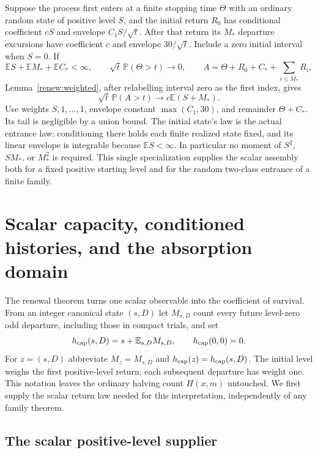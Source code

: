 \documentclass[11pt]{amsart}
\theoremstyle{definition}
\theoremstyle{remark}
\newcommand{\E}{\mathbb E}
\newcommand{\PP}{\mathbb P}
\begin{document}
Suppose the process first enters at a finite stopping time $\Theta$
with an ordinary random state of positive level $S$, and the initial
return $R_0$ has conditional coefficient $cS$ and envelope
$C_1S/\sqrt t$. After that return its $M_*$ departure excursions have
coefficient $c$ and envelope $30/\sqrt t$. Include a zero initial
interval when $S=0$. If
\[
 \E S+\E M_*+\E C_*<\infty,\qquad
 \sqrt t\,\PP(\Theta>t)\longrightarrow0,\qquad
 A=\Theta+R_0+C_*+\sum_{i\le M_*}R_i,
\]
Lemma~\ref{renew:weighted}, after relabelling interval zero as the first
index, gives
\begin{equation}\label{renew:initial-return}
 \sqrt t\,\PP(A>t)\longrightarrow c\E(S+M_*).
\end{equation}
Use weights $S,1,\ldots,1$, envelope constant $\max(C_1,30)$, and
remainder $\Theta+C_*$. Its tail is negligible by a union bound.
The initial state's law is the actual entrance law: conditioning there
holds each finite realized state fixed, and its linear envelope is
integrable because $\E S<\infty$. In particular no moment of $S^2$,
$SM_*$, or $M_*^2$ is required. This single specialization supplies the
scalar assembly both for a fixed positive starting level and for the
random two-class entrance of a finite family.

\section{Scalar capacity, conditioned histories, and the absorption domain}
\label{harm:section}

The renewal theorem turns one scalar observable into the coefficient of
survival. From an integer canonical state $(s,D)$ let $M_{s,D}$ count every future
level-zero odd departure, including those in compact trials, and set
\begin{equation}\label{harm:capacity}
 h_{\rm cap}(s,D)=s+\E_{s,D}M_{s,D},\qquad h_{\rm cap}(0,0)=0.
\end{equation}
For $z=(s,D)$ abbreviate $M_z=M_{s,D}$ and $h_{\rm cap}(z)=h_{\rm cap}(s,D)$.
The initial level weighs the first positive-level return; each subsequent
departure has weight one. This notation leaves the ordinary halving
count $H(x,m)$ untouched. We first supply the scalar return law needed
for this interpretation, independently of any family theorem.

\subsection{The scalar positive-level supplier}
\end{document}
